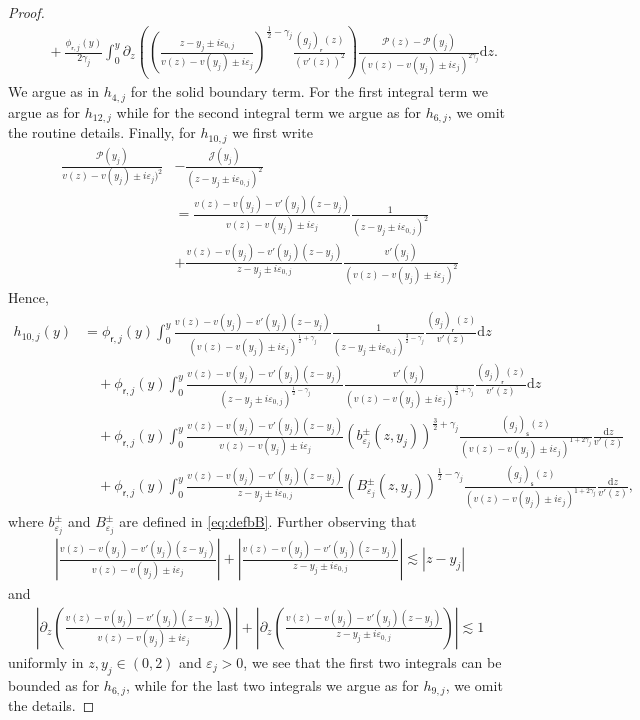 \documentclass[11pt,reqno]{amsproc}
\theoremstyle{definition}
\numberwithin{equation}{section}
\newcommand{\cJ}{{\mathcal{J}}}
\newcommand{\sr}{{\mathsf{r}}}
\newcommand{\s}{{\mathsf{s}}}
\renewcommand{\d}{\mathrm{d}}
\newcommand{\ep}{\varepsilon}
\renewcommand{\P}{{\mathcal{P}}}
\begin{document}
\begin{proof}
\begin{align*}
&\quad +\frac{\phi_{\sr,j}(y)}{2\gamma_j} \int_0^y \partial_z \left( \left( \frac{z-y_j \pm i\ep_{0,j}}{v(z) - v(y_j) \pm i\ep_j} \right)^{\frac12-\gamma_j}\frac{(g_j)_\sr(z)}{(v'(z))^2} \right) \frac{\P(z) - \P(y_j)}{(v(z) - v(y_j) \pm i\ep_j)^{2\gamma_j}} \d z. 
\end{align*}
We argue as in $h_{4,j}$ for the solid boundary term. For the first integral term we argue as for $h_{12,j}$ while for the second integral term we argue as for $h_{6,j}$, we omit the routine details. Finally, for $h_{10,j}$ we first write
\begin{align*}
\frac{\P(y_j)}{v(z) - v(y_j) \pm i\ep_j)^2} &- \frac{\cJ(y_j)}{(z-y_j\pm i\ep_{0,j})^2} \\
&= \frac{v(z) - v(y_j) - v'(y_j)(z-y_j)}{v(z) - v(y_j) \pm i\ep_j} \frac{1}{(z-y_j \pm i\ep_{0,j})^2} \\
&+ \frac{v(z) - v(y_j) - v'(y_j)(z-y_j)}{z-y_j \pm i\ep_{0,j}} \frac{v'(y_j)}{(v(z) - v(y_j) \pm i\ep_j)^2}
\end{align*}
Hence,
\begin{align*}
h_{10,j}(y) &= \phi_{\sr,j}(y)\int_0^y \frac{v(z) - v(y_j) - v'(y_j)(z-y_j)}{(v(z) - v(y_j) \pm i\ep_j)^{\frac12+\gamma_j}} \frac{1}{(z-y_j \pm i\ep_{0,j})^{\frac32-\gamma_j}}\frac{(g_j)_\sr(z)}{v'(z)} \d z \\
&\quad + \phi_{\sr,j}(y)\int_0^y \frac{v(z) - v(y_j) - v'(y_j)(z-y_j)}{(z-y_j \pm i\ep_{0,j})^{\frac12-\gamma_j}} \frac{v'(y_j)}{(v(z) - v(y_j) \pm i\ep_j)^{\frac32+\gamma_j}} \frac{(g_j)_\sr(z)}{v'(z)} \d z \\
&\quad +\phi_{\sr,j}(y) \int_0^y \frac{v(z) - v(y_j) - v'(y_j)(z-y_j)}{v(z) - v(y_j) \pm i\ep_j} \left( b_{\ep_j}^\pm(z,y_j)\right)^{\frac32+\gamma_j} \frac{(g_j)_\s(z)}{(v(z) - v(y_j) \pm i\ep_j)^{1+2\gamma_j}}\frac{ \d z}{v'(z)} \\
&\quad +\phi_{\sr,j}(y) \int_0^y \frac{v(z) - v(y_j) -v'(y_j)(z-y_j)}{z-y_j\pm i\ep_{0,j}} \left( B_{\ep_j}^\pm(z,y_j) \right)^{\frac12-\gamma_j} \frac{(g_j)_\s(z)}{(v(z) - v(y_j) \pm i\ep_j)^{1+2\gamma_j}}\frac{ \d z}{v'(z)},
\end{align*}
where $b_{\ep_j}^\pm$ and $B_{\ep_j}^\pm$ are defined in \eqref{eq:defbB}. Further observing that 
\begin{align*}
\left| \frac{v(z) - v(y_j) - v'(y_j)(z-y_j)}{v(z) - v(y_j) \pm i\ep_j} \right| + \left|  \frac{v(z) - v(y_j) - v'(y_j)(z-y_j)}{z-y_j \pm i\ep_{0,j}}  \right| \lesssim |z-y_j|
\end{align*}
and
\begin{align*}
\left| \partial_z \left( \frac{v(z) - v(y_j) - v'(y_j)(z-y_j)}{v(z) - v(y_j) \pm i\ep_j} \right) \right| + \left| \partial_z \left( \frac{v(z) - v(y_j) - v'(y_j)(z-y_j)}{z-y_j \pm i\ep_{0,j}} \right) \right| \lesssim 1
\end{align*}
uniformly in $z,y_j\in (0,2)$ and $\ep_j>0$, we see that the first two integrals can be bounded as for $h_{6,j}$, while for the last two integrals we argue as for $h_{9,j}$, we omit the details.
\end{proof}
\end{document}
